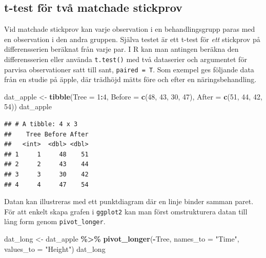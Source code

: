 \documentclass[
]{book}
\newenvironment{Shaded}{\begin{snugshade}}{\end{snugshade}}
\newcommand{\AttributeTok}[1]{\textcolor[rgb]{0.13,0.29,0.53}{#1}}
\newcommand{\DecValTok}[1]{\textcolor[rgb]{0.00,0.00,0.81}{#1}}
\newcommand{\FunctionTok}[1]{\textcolor[rgb]{0.13,0.29,0.53}{\textbf{#1}}}
\newcommand{\NormalTok}[1]{#1}
\newcommand{\OtherTok}[1]{\textcolor[rgb]{0.56,0.35,0.01}{#1}}
\newcommand{\SpecialCharTok}[1]{\textcolor[rgb]{0.81,0.36,0.00}{\textbf{#1}}}
\newcommand{\StringTok}[1]{\textcolor[rgb]{0.31,0.60,0.02}{#1}}
\theoremstyle{definition}
\theoremstyle{definition}
\theoremstyle{definition}
\theoremstyle{definition}
\theoremstyle{remark}
\begin{document}
\subsection{t-test för två matchade stickprov}\label{t-test-fuxf6r-tvuxe5-matchade-stickprov}

Vid matchade stickprov kan varje observation i en behandlingsgrupp paras med en observation i den andra gruppen. Själva testet är ett t-test för \emph{ett} stickprov på differensserien beräknat från varje par. I R kan man antingen beräkna den differensserien eller använda \texttt{t.test()} med två dataserier och argumentet för parvisa observationer satt till sant, \texttt{paired\ =\ T}.
Som exempel ges följande data från en studie på äpple, där trädhöjd mätts före och efter en näringsbehandling.

\begin{Shaded}
\begin{Highlighting}[]
\NormalTok{dat\_apple }\OtherTok{\textless{}{-}} \FunctionTok{tibble}\NormalTok{(}\AttributeTok{Tree =} \DecValTok{1}\SpecialCharTok{:}\DecValTok{4}\NormalTok{, }
              \AttributeTok{Before =} \FunctionTok{c}\NormalTok{(}\DecValTok{48}\NormalTok{, }\DecValTok{43}\NormalTok{, }\DecValTok{30}\NormalTok{, }\DecValTok{47}\NormalTok{), }
              \AttributeTok{After =} \FunctionTok{c}\NormalTok{(}\DecValTok{51}\NormalTok{, }\DecValTok{44}\NormalTok{, }\DecValTok{42}\NormalTok{, }\DecValTok{54}\NormalTok{))}
\NormalTok{dat\_apple}
\end{Highlighting}
\end{Shaded}

\begin{verbatim}
## # A tibble: 4 x 3
##    Tree Before After
##   <int>  <dbl> <dbl>
## 1     1     48    51
## 2     2     43    44
## 3     3     30    42
## 4     4     47    54
\end{verbatim}

Datan kan illustreras med ett punktdiagram där en linje binder samman paret. För att enkelt skapa grafen i \texttt{ggplot2} kan man först omstrukturera datan till lång form genom \texttt{pivot\_longer}.

\begin{Shaded}
\begin{Highlighting}[]
\NormalTok{dat\_long }\OtherTok{\textless{}{-}}\NormalTok{ dat\_apple }\SpecialCharTok{\%\textgreater{}\%} \FunctionTok{pivot\_longer}\NormalTok{(}\SpecialCharTok{{-}}\NormalTok{Tree, }\AttributeTok{names\_to =} \StringTok{"Time"}\NormalTok{, }\AttributeTok{values\_to =} \StringTok{"Height"}\NormalTok{)}
\NormalTok{dat\_long}
\end{Highlighting}
\end{Shaded}
\end{document}
